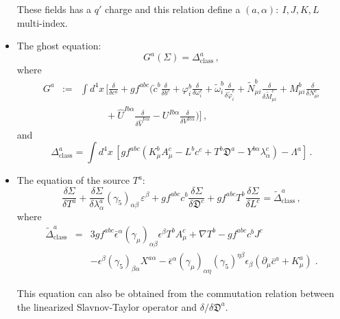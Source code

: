 \begin{appendix}
\begin{itemize}
\noindent These fields has a $q'$ charge and this relation define a $(a,\alpha)\!:~ I,J,K,L$ 
multi-index.

\item{The ghost equation:}
\begin{equation}
G^{a}(\Sigma)=\Delta^{a}_{\mathrm{class}}\,,
\end{equation}
where
\begin{eqnarray}
G^{a}&:=&\int d^{4}x\,\biggl[\frac{\delta}{\delta{c}^{a}}+gf^{abc}\biggl(\check{c}^{b}\frac{\delta}{\delta{b}^{c}}
+\varphi^{b}_{i}\frac{\delta}{\delta\omega^{c}_{i}}
+\tilde\omega^{b}_{i}\frac{\delta}{\delta\tilde\varphi^{c}_{i}}
+\tilde{N}^{b}_{\mu i}\frac{\delta}{\delta\tilde{M}^{c}_{\mu i}}
+M^{b}_{\mu i}\frac{\delta}{\delta N^{c}_{\mu i}}\nonumber\\
&&\phantom{\int d^{4}x\,}+\hat{U}^{Ib\alpha}\frac{\delta}{\delta\hat{V}^{Ic\alpha}}
-U^{Ib\alpha}\frac{\delta}{\delta V^{Ic\alpha}}\biggr)\biggr]\,,
\end{eqnarray}
and
\begin{equation}
\Delta^{a}_{\mathrm{class}}=\int d^{4}x\,\left[gf^{abc}\left(K^{b}_{\mu}A^{c}_{\mu}
-L^{b}c^{c}+T^{b}\mathfrak{D}^{a}
-Y^{b\alpha}\lambda^{c}_{\alpha}\right)-\Lambda^{a}\right]\,.
\end{equation}

\item The equation of the source $T^{a}$:
\begin{equation}
\frac{\delta\Sigma}{\delta{T^{a}}}
+\frac{\delta\Sigma}{\delta{\lambda^{a}_{\alpha}}}(\gamma_{5})_{\alpha\beta}\,\varepsilon^{\beta}
+gf^{abc} c^{b}\frac{\delta\Sigma}{\delta{\mathfrak{D}^{c}}}
+gf^{abc}T^{b}\frac{\delta\Sigma}{\delta{L^{c}}}=\tilde\Delta^{a}_{\mathrm{class}}\,,
\end{equation}
where
\begin{eqnarray}
\tilde\Delta^{a}_{\mathrm{class}} &=&
3gf^{abc}\bar{\epsilon}^{\alpha}(\gamma_{\mu})_{\alpha\beta}\epsilon^{\beta}T^{b}A^{c}_{\mu} 
+ \nabla T^{b}
-gf^{abc}c^{b}J^{c}
\nonumber \\
&&
-\epsilon^{\beta}(\gamma_{5})_{\beta\alpha}X^{a\alpha}
-\bar{\epsilon}^{\alpha}(\gamma_{\mu})_{\alpha\eta}(\gamma_{5})^{\eta\beta}\epsilon_{\beta} \left( \partial_{\mu}\bar{c}^{a} + K^{a}_{\mu} \right) \;.
\end{eqnarray}

\noindent This equation can also be obtained from the commutation relation between the linearized Slavnov-Taylor operator and $\delta/\delta{\mathfrak{D}}^{a}$.


\end{itemize}
\end{appendix}
